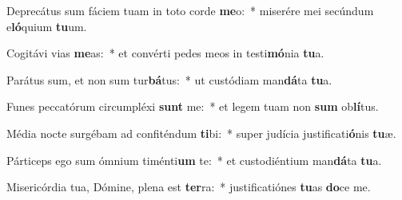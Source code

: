 \item Deprecátus sum fáciem tuam in toto corde \textbf{me}o:~* miserére mei secúndum e\textbf{ló}quium \textbf{tu}um.
\item Cogitávi vias \textbf{me}as:~* et convérti pedes meos in testi\textbf{mó}nia \textbf{tu}a.
\item Parátus sum, et non sum tur\textbf{bá}tus:~* ut custódiam man\textbf{dá}ta \textbf{tu}a.
\item Funes peccatórum circumpléxi \textbf{sunt} me:~* et legem tuam non \textbf{sum} ob\textbf{lí}tus.
\item Média nocte surgébam ad confiténdum \textbf{ti}bi:~* super judícia justificati\textbf{ó}nis \textbf{tu}æ.
\item Párticeps ego sum ómnium timénti\textbf{um} te:~* et custodiéntium man\textbf{dá}ta \textbf{tu}a.
\item Misericórdia tua, Dómine, plena est \textbf{ter}ra:~* justificatiónes \textbf{tu}as \textbf{do}ce me.
